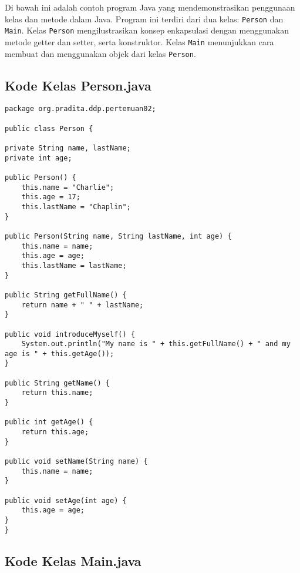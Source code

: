 Di bawah ini adalah contoh program Java yang mendemonstrasikan penggunaan kelas dan metode dalam Java. Program ini terdiri dari dua kelas: \texttt{Person} dan \texttt{Main}. Kelas \texttt{Person} mengilustrasikan konsep enkapsulasi dengan menggunakan metode getter dan setter, serta konstruktor. Kelas \texttt{Main} menunjukkan cara membuat dan menggunakan objek dari kelas \texttt{Person}.

\subsection{Kode Kelas Person.java}

\begin{lstlisting}[style=JavaStyle, caption={Kode Java: Person.java}]
package org.pradita.ddp.pertemuan02;

public class Person {

private String name, lastName;
private int age;

public Person() {
	this.name = "Charlie";
	this.age = 17;
	this.lastName = "Chaplin";
}

public Person(String name, String lastName, int age) {
	this.name = name;
	this.age = age;
	this.lastName = lastName;
}

public String getFullName() {
	return name + " " + lastName;
}

public void introduceMyself() {
	System.out.println("My name is " + this.getFullName() + " and my age is " + this.getAge());
}

public String getName() {
	return this.name;
}

public int getAge() {
	return this.age;
}

public void setName(String name) {
	this.name = name;
}

public void setAge(int age) {
	this.age = age;
}
}
\end{lstlisting}

\subsection{Kode Kelas Main.java}


